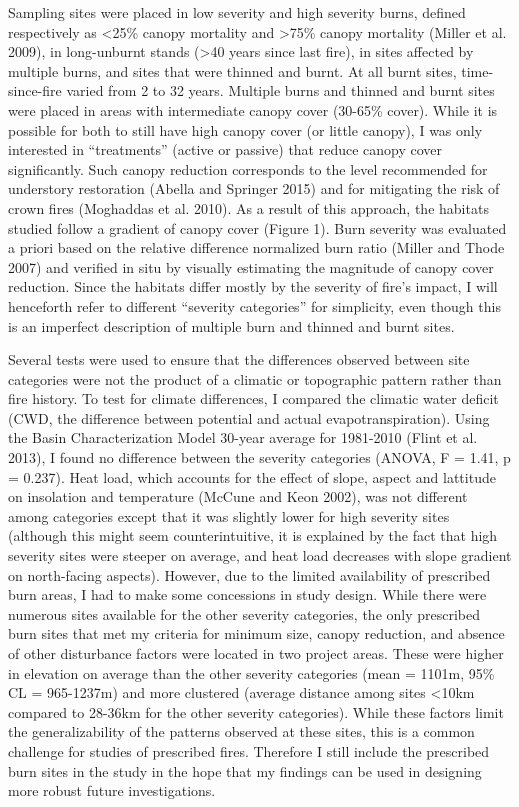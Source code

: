 \documentclass[]{article}
\begin{document}
Sampling sites were placed in low severity and high severity burns,
defined respectively as \textless{}25\% canopy mortality and
\textgreater{}75\% canopy mortality (Miller et al. 2009), in
long-unburnt stands (\textgreater{}40 years since last fire), in sites
affected by multiple burns, and sites that were thinned and burnt. At
all burnt sites, time-since-fire varied from 2 to 32 years. Multiple
burns and thinned and burnt sites were placed in areas with intermediate
canopy cover (30-65\% cover). While it is possible for both to still
have high canopy cover (or little canopy), I was only interested in
``treatments'' (active or passive) that reduce canopy cover
significantly. Such canopy reduction corresponds to the level
recommended for understory restoration (Abella and Springer 2015) and
for mitigating the risk of crown fires (Moghaddas et al. 2010). As a
result of this approach, the habitats studied follow a gradient of
canopy cover (Figure 1). Burn severity was evaluated a priori based on
the relative difference normalized burn ratio (Miller and Thode 2007)
and verified in situ by visually estimating the magnitude of canopy
cover reduction. Since the habitats differ mostly by the severity of
fire's impact, I will henceforth refer to different ``severity
categories'' for simplicity, even though this is an imperfect
description of multiple burn and thinned and burnt sites.

Several tests were used to ensure that the differences observed between
site categories were not the product of a climatic or topographic
pattern rather than fire history. To test for climate differences, I
compared the climatic water deficit (CWD, the difference between
potential and actual evapotranspiration). Using the Basin
Characterization Model 30-year average for 1981-2010 (Flint et al.
2013), I found no difference between the severity categories (ANOVA, F =
1.41, p = 0.237). Heat load, which accounts for the effect of slope,
aspect and lattitude on insolation and temperature (McCune and Keon
2002), was not different among categories except that it was slightly
lower for high severity sites (although this might seem
counterintuitive, it is explained by the fact that high severity sites
were steeper on average, and heat load decreases with slope gradient on
north-facing aspects). However, due to the limited availability of
prescribed burn areas, I had to make some concessions in study design.
While there were numerous sites available for the other severity
categories, the only prescribed burn sites that met my criteria for
minimum size, canopy reduction, and absence of other disturbance factors
were located in two project areas. These were higher in elevation on
average than the other severity categories (mean = 1101m, 95\% CL =
965-1237m) and more clustered (average distance among sites
\textless{}10km compared to 28-36km for the other severity categories).
While these factors limit the generalizability of the patterns observed
at these sites, this is a common challenge for studies of prescribed
fires. Therefore I still include the prescribed burn sites in the study
in the hope that my findings can be used in designing more robust future
investigations.
\end{document}

